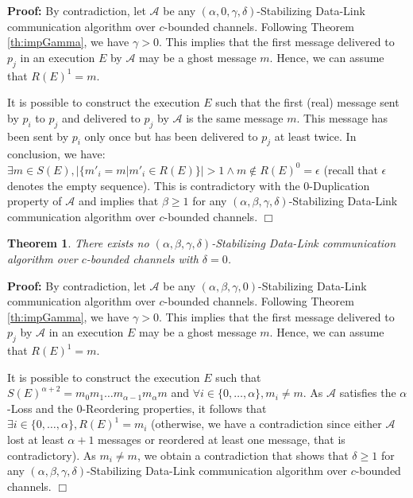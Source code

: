 \documentclass[11pt]{article}
\newtheorem{theorem}{Theorem}
\newenvironment{proof}{\noindent\textbf{Proof:}}{\hfill$\Box$}
\begin{document}
\begin{proof}
By contradiction, let $\mathcal{A}$ be any $(\alpha,0,\gamma,\delta)$-Stabilizing Data-Link communication algorithm over $c$-bounded channels. Following Theorem \ref{th:impGamma}, we have $\gamma>0$. This implies that the first message delivered to $p_j$ in an execution $E$ by $\mathcal{A}$ may be a ghost message $m$. Hence, we can assume that $R(E)^1=m$.

It is possible to construct the execution $E$ such that the first (real) message sent by $p_i$ to $p_j$ and delivered to $p_j$ by $\mathcal{A}$ is the same message $m$. This message has been sent by $p_i$ only once but has been delivered to $p_j$ at least twice. In conclusion, we have: $\exists m\in S(E),\big|\{m'_i=m|m'_i\in R(E)\}\big|>1 \wedge m\notin R(E)^0=\epsilon$ (recall that $\epsilon$ denotes the empty sequence). This is contradictory with the 0-Duplication property of $\mathcal{A}$ and implies that $\beta\geq 1$ for any $(\alpha,\beta,\gamma,\delta)$-Stabilizing Data-Link communication algorithm over $c$-bounded channels.
\end{proof}

\begin{theorem}\label{th:impDelta}
There exists no $(\alpha,\beta,\gamma,\delta)$-Stabilizing Data-Link communication algorithm over $c$-bounded channels with $\delta=0$.
\end{theorem}

\begin{proof}
By contradiction, let $\mathcal{A}$ be any $(\alpha,\beta,\gamma,0)$-Stabilizing Data-Link communication algorithm over $c$-bounded channels. Following Theorem \ref{th:impGamma}, we have $\gamma>0$.  This implies that the first message delivered to $p_j$ by $\mathcal{A}$ in an execution $E$ may be a ghost message $m$. Hence, we can assume that $R(E)^1=m$.

It is possible to construct the execution $E$ such that $S(E)^{\alpha+2}=m_0m_1\ldots m_{\alpha-1}m_\alpha m$ and $\forall i\in\{0,\ldots,\alpha\},m_i\neq m$. As $\mathcal{A}$ satisfies the $\alpha$-Loss and the 0-Reordering properties, it follows that $\exists i\in\{0,\ldots,\alpha\},R(E)^1=m_i$ (otherwise, we have a contradiction since either $\mathcal{A}$ lost at least $\alpha+1$ messages or reordered at least one message, that is contradictory). As $m_i\neq m$, we obtain a contradiction that shows that $\delta\geq 1$ for any $(\alpha,\beta,\gamma,\delta)$-Stabilizing Data-Link communication algorithm over $c$-bounded channels.
\end{proof}
\end{document}
